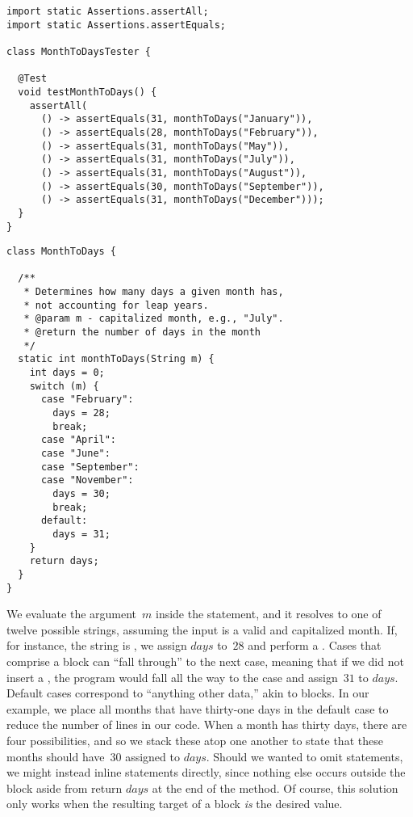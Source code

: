 \begin{lstlisting}[language=MyJava]
import static Assertions.assertAll;
import static Assertions.assertEquals;

class MonthToDaysTester {

  @Test
  void testMonthToDays() {
    assertAll(
      () -> assertEquals(31, monthToDays("January")),
      () -> assertEquals(28, monthToDays("February")),
      () -> assertEquals(31, monthToDays("May")),
      () -> assertEquals(31, monthToDays("July")),
      () -> assertEquals(31, monthToDays("August")),
      () -> assertEquals(30, monthToDays("September")),
      () -> assertEquals(31, monthToDays("December")));
  }
}
\end{lstlisting}

\begin{lstlisting}[language=MyJava]
class MonthToDays {

  /**
   * Determines how many days a given month has, 
   * not accounting for leap years.
   * @param m - capitalized month, e.g., "July".
   * @return the number of days in the month
   */
  static int monthToDays(String m) {
    int days = 0;
    switch (m) {
      case "February":
        days = 28;
        break;
      case "April":
      case "June":
      case "September":
      case "November":
        days = 30;
        break;
      default:
        days = 31;
    }
    return days;
  }
}
\end{lstlisting}

We evaluate the argument~$m$ inside the  statement, and it resolves to one of twelve possible strings, assuming the input is a valid and capitalized month. 
If, for instance, the string is , we assign $\mathit{days}$ to~$28$ and perform a . 
Cases that comprise a  block can ``fall through'' to the next case, meaning that if we did not insert a , the program would fall all the way to the  case and assign~$31$ to $\mathit{days}$. 
Default cases correspond to ``anything other data,'' akin to  blocks. 
In our example, we place all months that have thirty-one days in the default case to reduce the number of lines in our code. 
When a month has thirty days, there are four possibilities, and so we stack these atop one another to state that these months should have~$30$ assigned to $\mathit{days}$. 
Should we wanted to omit  statements, we might instead inline  statements directly, since nothing else occurs outside the  block aside from return $\mathit{days}$ at the end of the method. 
Of course, this solution only works when the resulting target of a  block \emph{is} the desired value.
